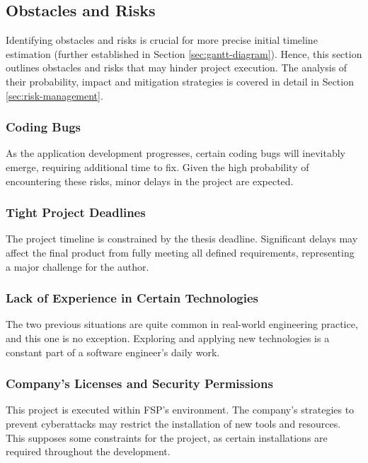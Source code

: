 \subsection{Obstacles and Risks}
\label{sec:obstaclesandrisks}
Identifying obstacles and risks is crucial for more precise initial timeline estimation (further established in Section \ref{sec:gantt-diagram}). Hence, this section outlines obstacles and risks that may hinder project execution. The analysis of their probability, impact and mitigation strategies is covered in detail in Section \ref{sec:risk-management}.

\subsubsection{Coding Bugs}

As the application development progresses, certain coding bugs will inevitably emerge, requiring additional time to fix. Given the high probability of encountering these risks, minor delays in the project are expected.

\subsubsection{Tight Project Deadlines}

The project timeline is constrained by the thesis deadline. Significant delays may affect the final product from fully meeting all defined requirements, representing a major challenge for the author.

\subsubsection{Lack of Experience in Certain Technologies}

The two previous situations are quite common in real-world engineering practice, and this one is no exception. Exploring and applying new technologies is a constant part of a software engineer's daily work.

\subsubsection{Company's Licenses and Security Permissions}

This project is executed within FSP's environment. The company's strategies to prevent cyberattacks may restrict the installation of new tools and resources. This supposes some constraints for the project, as certain installations are required throughout the development.



